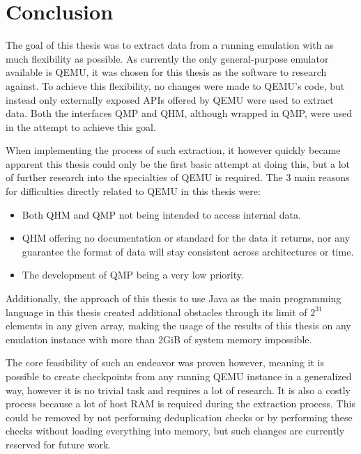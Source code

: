 
\chapter{Conclusion}
The goal of this thesis was to extract data from a running emulation
with as much flexibility as possible.
As currently the only general-purpose emulator available is QEMU,
it was chosen for this thesis as the software to research against.
To achieve this flexibility, no changes were made to QEMU's code,
but instead only externally exposed APIs offered by QEMU were used to extract data.
Both the interfaces QMP and QHM, although wrapped in QMP,
were used in the attempt to achieve this goal.

When implementing the process of such extraction,
it however quickly became apparent this thesis could only be the first basic attempt at doing this,
but a lot of further research into the specialties of QEMU is required.
The 3 main reasons for difficulties directly related to QEMU in this thesis were:
\begin{itemize}
    \item Both QHM and QMP not being intended to access internal data.
    \item QHM offering no documentation or standard for the data it returns,
    nor any guarantee the format of data will stay consistent across architectures or time.
    \item The development of QMP being a very low priority.
\end{itemize}
Additionally, the approach of this thesis to use Java as the main programming language in this thesis created additional obstacles
through its limit of $2^{31}$ elements in any given array,
making the usage of the results of this thesis on any emulation instance with more than 2GiB of system memory impossible.

The core feasibility of such an endeavor was proven however,
meaning it is possible to create checkpoints from any running QEMU instance in a generalized way,
however it is no trivial task and requires a lot of research.
It is also a costly process because a lot of host RAM is required during the extraction process.
This could be removed by not performing deduplication checks
or by performing these checks without loading everything into memory,
but such changes are currently reserved for future work.


